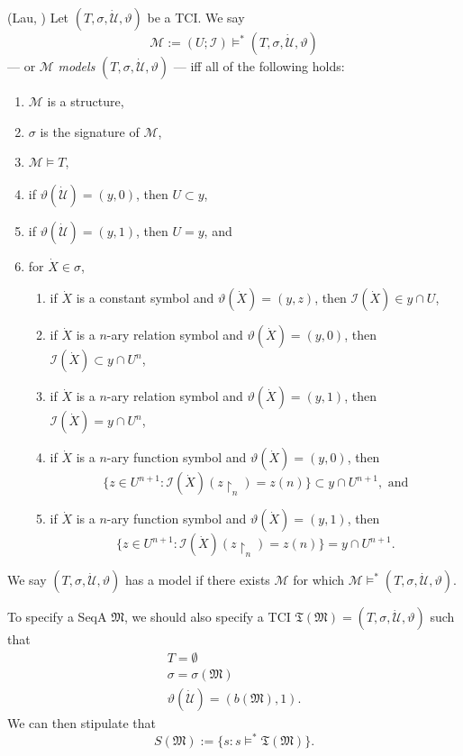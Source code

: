 \documentclass[12pt]{article}
\numberwithin{equation}{section}
\begin{document}
\begin{defi}(Lau, \cite{myself})
Let $(T, \sigma, \dot{\mathcal{U}}, \vartheta)$ be a TCI. We say $$\mathcal{M} := (U; \mathcal{I}) \models^* (T, \sigma, \dot{\mathcal{U}}, \vartheta)$$ --- or $\mathcal{M}$ \emph{models} $(T, \sigma, \dot{\mathcal{U}}, \vartheta)$ --- iff all of the following holds:
\begin{enumerate}[label=(\alph*)]
    \item $\mathcal{M}$ is a structure,
    \item $\sigma$ is the signature of $\mathcal{M}$,
    \item $\mathcal{M} \models T$,
    \item if $\vartheta(\dot{\mathcal{U}}) = (y, 0)$, then $U \subset y$,
    \item if $\vartheta(\dot{\mathcal{U}}) = (y, 1)$, then $U = y$, and
    \item for $\dot{X} \in \sigma$,
    \begin{enumerate}[label=(\roman*)]
        \item if $\dot{X}$ is a constant symbol and $\vartheta(\dot{X}) = (y, z)$, then $\mathcal{I}(\dot{X}) \in y \cap U$,
        \item if $\dot{X}$ is a $n$-ary relation symbol and $\vartheta(\dot{X}) = (y, 0)$, then $\mathcal{I}(\dot{X}) \subset y \cap U^{n}$,
        \item if $\dot{X}$ is a $n$-ary relation symbol and $\vartheta(\dot{X}) = (y, 1)$, then $\mathcal{I}(\dot{X}) = y \cap U^{n}$,
        \item if $\dot{X}$ is a $n$-ary function symbol and $\vartheta(\dot{X}) = (y, 0)$, then $$\{z \in U^{n+1} : \mathcal{I}(\dot{X})(z \! \restriction_n) = z(n)\} \subset y \cap U^{n+1}, \text{ and}$$
        \item if $\dot{X}$ is a $n$-ary function symbol and $\vartheta(\dot{X}) = (y, 1)$, then $$\{z \in U^{n+1} : \mathcal{I}(\dot{X})(z \! \restriction_n) = z(n)\} = y \cap U^{n+1}.$$
    \end{enumerate}
\end{enumerate}
We say $(T, \sigma, \dot{\mathcal{U}}, \vartheta)$ has a model if there exists $\mathcal{M}$ for which $\mathcal{M} \models^* (T, \sigma, \dot{\mathcal{U}}, \vartheta)$.
\end{defi}

To specify a SeqA $\mathfrak{M}$, we should also specify a TCI $\mathfrak{T}(\mathfrak{M}) = (T, \sigma, \dot{\mathcal{U}}, \vartheta)$ such that 
\begin{gather*}
    T = \emptyset \\
    \sigma = \sigma(\mathfrak{M}) \\
    \vartheta(\dot{\mathcal{U}}) = (b(\mathfrak{M}), 1).
\end{gather*}
We can then stipulate that 
\begin{equation*}
    S(\mathfrak{M}) := \{s : s \models^* \mathfrak{T}(\mathfrak{M})\} \text{.}
\end{equation*}
\end{document}
